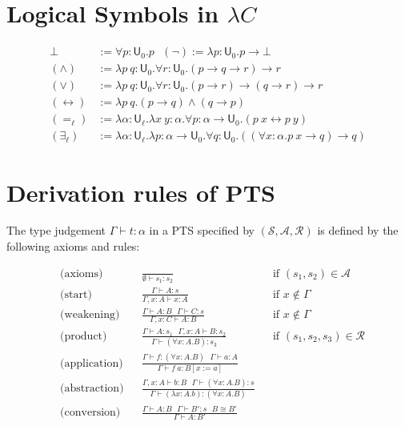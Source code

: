 \appendix
\section{Logical Symbols in $\lambda C$}\label{applsc}

  \begin{align*}
  \bot &:= \forall p : \mathsf{U}_0. p \ \ \ (\neg) := \lambda p : \mathsf{U}_0. p \to \bot \\
  (\land) &:= \lambda p \ q : \mathsf{U}_0. \forall r : \mathsf{U}_0. (p \to q \to r) \to r \\
  (\lor) &:= \lambda p \ q : \mathsf{U}_0. \forall r : \mathsf{U}_0. (p \to r) \to (q \to r) \to r \\
  (\leftrightarrow) &:= \lambda p \ q. (p \to q) \land (q \to p) \\
  (=_\ell) &:= \lambda \alpha : \mathsf{U}_\ell. \lambda x \ y : \alpha. \forall p : \alpha \to \mathsf{U}_0. (p \ x \leftrightarrow p \ y) \\
  (\exists_\ell) &:= \lambda \alpha : \mathsf{U}_\ell. \lambda p : \alpha \to \mathsf{U}_0. \forall q : \mathsf{U}_0. ((\forall x : \alpha. p \ x \to q) \to q)
  \end{align*}

\section{Derivation rules of PTS}\label{apppts}

  The type judgement $\Gamma \vdash t : \alpha$ in a PTS specified
  by $(\mathcal{S}, \mathcal{A}, \mathcal{R})$ is defined by the following
  axioms and rules:

  \begin{align*}
  & \text{(axioms)}      & & \frac{}{\emptyset \vdash s_1 : s_2} & & \text{if } (s_1, s_2) \in \mathcal{A} \\
  & \text{(start)}       & & \frac{\Gamma \vdash A : s}{\Gamma, x : A \vdash x : A} & & \text{if } x \notin \Gamma \\
  & \text{(weakening)}   & & \frac{\Gamma \vdash A : B \ \ \ \Gamma \vdash C : s}{\Gamma, x : C \vdash A : B} & & \text{if } x \notin \Gamma \\
  & \text{(product)}     & & \frac{\Gamma \vdash A : s_1 \ \ \ \Gamma, x : A \vdash B : s_2}{\Gamma \vdash (\forall x : A. B) : s_3} & & \text{if } (s_1, s_2, s_3) \in \mathcal{R} \\
  & \text{(application)} & & \frac{\Gamma \vdash f : (\forall x : A. B) \ \ \ \Gamma \vdash a : A}{\Gamma \vdash f \ a : B[x := a]} & & \\
  & \text{(abstraction)} & & \frac{\Gamma, x : A \vdash b : B \ \ \ \Gamma \vdash (\forall x : A. B) : s}{\Gamma \vdash (\lambda x : A.b) : (\forall x : A. B)} & & \\
  & \text{(conversion)}  & & \frac{\Gamma \vdash A : B \ \ \ \Gamma \vdash B' : s \ \ \ B \cong B'}{\Gamma \vdash A : B'} & &
  \end{align*}

